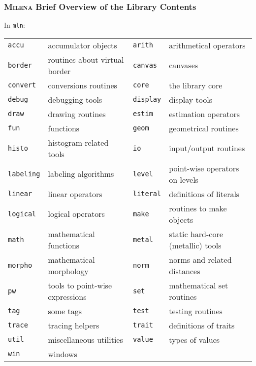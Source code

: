 \documentclass{beamer}
\newcommand{\mln}{\textsc{Milena}\xspace}
\begin{document}





\begin{frame}
  \frametitle{\mln Brief Overview of the Library Contents}

  In \texttt{mln}:
\smallskip

{\scriptsize
\hspace*{-5mm}
    \begin{tabular}{|ll|ll|}
      \hline
\texttt{accu} & accumulator objects &
\texttt{arith} & arithmetical operators \\
\texttt{border} & routines about virtual border &
\texttt{canvas} & canvases \\
\texttt{convert} & conversions routines &
\texttt{core} & the library core \\
\texttt{debug} & debugging tools &
\texttt{display} & display tools \\
\texttt{draw} & drawing routines &
\texttt{estim} & estimation operators \\
\texttt{fun} & functions &
\texttt{geom} & geometrical routines \\
\texttt{histo} & histogram-related tools &
\texttt{io} & input/output routines \\
\texttt{labeling} & labeling algorithms &
\texttt{level} & point-wise operators on levels \\
\texttt{linear} & linear operators &
\texttt{literal} & definitions of literals \\
\texttt{logical} & logical operators &
\texttt{make} & routines to make objects \\
\texttt{math} & mathematical functions &
\texttt{metal} & static hard-core (metallic) tools \\
\texttt{morpho} & mathematical morphology &
\texttt{norm} & norms and related distances \\
\texttt{pw} & tools to point-wise expressions  &
\texttt{set} & mathematical set routines \\
\texttt{tag} & some tags &
\texttt{test} & testing routines \\
\texttt{trace} & tracing helpers &
\texttt{trait} & definitions of traits \\
\texttt{util} & miscellaneous utilities &
\texttt{value} & types of values \\
\texttt{win} & windows & & \\
      \hline
    \end{tabular}
} %

\end{frame}
\end{document}
